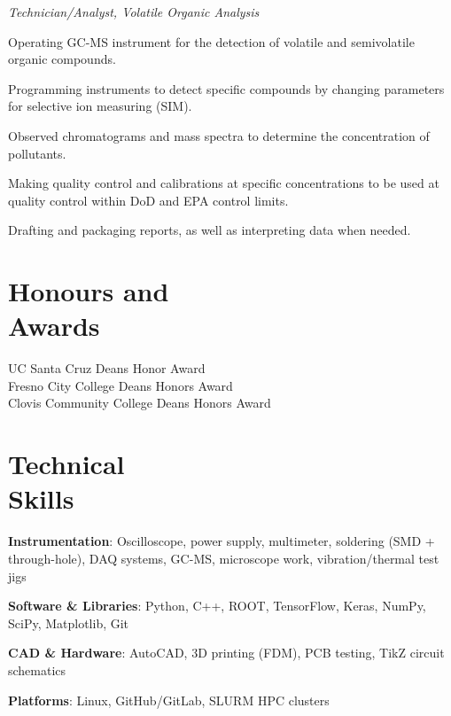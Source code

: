 \documentclass[margin,line]{resume}
\let\origsection\section%
\let\section\subsection%
\let\section\origsection%
\begin{document}
\begin{resume}
\textsl{Technician/Analyst, Volatile Organic Analysis}
\begin{list2}
  \item Operating GC-MS instrument for the detection of volatile and semivolatile organic compounds.
  \item Programming instruments to detect specific compounds by changing parameters for selective ion measuring (SIM).
  \item Observed chromatograms and mass spectra to determine the concentration of pollutants.
  \item Making quality control and calibrations at specific concentrations to be used at quality control within DoD and EPA control limits.
  \item Drafting and packaging reports, as well as interpreting data when needed.
\end{list2}


\section{\mysidestyle Honours and\\Awards}

UC Santa Cruz Deans Honor Award\\
Fresno City College Deans Honors Award\\
Clovis Community College Deans Honors Award\\



\section{\mysidestyle Technical \\Skills}
\textbf{Instrumentation}: Oscilloscope, power supply, multimeter, soldering (SMD + through-hole), DAQ systems, GC-MS, microscope work, vibration/thermal test jigs

\textbf{Software \& Libraries}: Python, C++, ROOT, TensorFlow, Keras, NumPy, SciPy, Matplotlib, Git

\textbf{CAD \& Hardware}: AutoCAD, 3D printing (FDM), PCB testing, TikZ circuit schematics

\textbf{Platforms}: Linux, GitHub/GitLab, SLURM HPC clusters

\end{resume}
\end{document}
